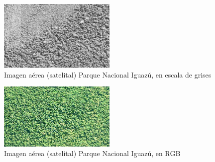 \begin{figure}[h!]
    \includegraphics[width=0.5\textwidth]{Imagenes/Homomorfico/PNI1gris.jpg}
     \hfill
     \caption{Imagen aérea (satelital) Parque Nacional Iguazú, en escala de grises}
\end{figure}

\begin{figure}[h!]
    \includegraphics[width=0.5\textwidth]{Imagenes/Homomorfico/PNI2_original.jpg}
     \hfill
     \caption{Imagen aérea (satelital) Parque Nacional Iguazú, en RGB}
\end{figure}

